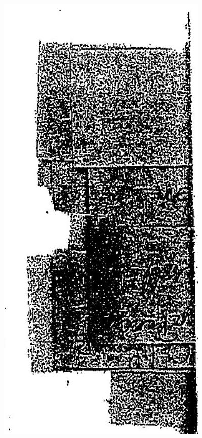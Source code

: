 \documentclass[10pt]{article}
\begin{document}
\includegraphics[max width=\textwidth, center]{2025_02_27_dd68c3d38de88f0516d9g-159(1)}\\
\end{document}
